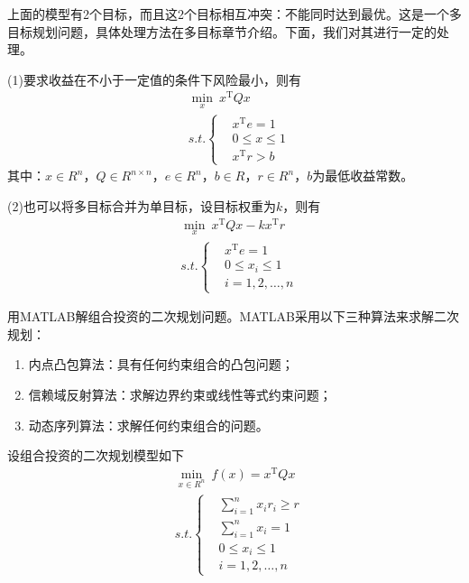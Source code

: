     \par
    上面的模型有2个目标，而且这2个目标相互冲突：不能同时达到最优。这是一个多目标规划问题，具体处理方法在多目标章节介绍。下面，我们对其进行一定的处理。
    \par
    (1)要求收益在不小于一定值的条件下风险最小，则有
    \begin{align*}
    &\mathop {\min}\limits_x \ x^\mathrm{T} Qx\\
    &s.t.\left\{
    \begin{aligned}
    &x^\mathrm{T} e=1\\
    & 0 \leqslant x \leqslant 1\\
    &x^\mathrm{T} r > b
    \end{aligned}
    \right.
    \end{align*}
    其中：$x \in R^n$，$Q \in R^{n\times n}$，$e \in R^n$，$b \in R$，$r \in R^n$，$b$为最低收益常数。
    \par
    (2)也可以将多目标合并为单目标，设目标权重为$k$，则有
    \begin{align*}
    &\mathop {\min}\limits_x\  x^\mathrm{T} Qx-kx^\mathrm{T} r\\
    &s.t.\left\{
    \begin{aligned}
    &x^\mathrm{T} e=1\\
    &0 \leqslant x_i \leqslant 1\\
    & i = 1,2,\dots,n
    \end{aligned}
    \right.
    \end{align*}
    \par
    用MATLAB解组合投资的二次规划问题。MATLAB采用以下三种算法来求解二次规划：
    \begin{enumerate}
    \item 内点凸包算法：具有任何约束组合的凸包问题；
    \item 信赖域反射算法：求解边界约束或线性等式约束问题；
    \item 动态序列算法：求解任何约束组合的问题。
    \end{enumerate}
    \par
    设组合投资的二次规划模型如下
    \begin{align*}
    &\mathop {\min}\limits_{x \in R^n}\  f(x)=x^\mathrm{T} Qx\\
    &s.t.\left\{
    \begin{aligned}
    &\mathop {\sum}\limits_{i=1}^n x_ir_i \geqslant r\\
    &\mathop {\sum}\limits_{i=1}^n x_i = 1\\
    &0 \leqslant x_i \leqslant 1\\
    &i=1,2,\ldots,n
    \end{aligned}
    \right.
    \end{align*}
